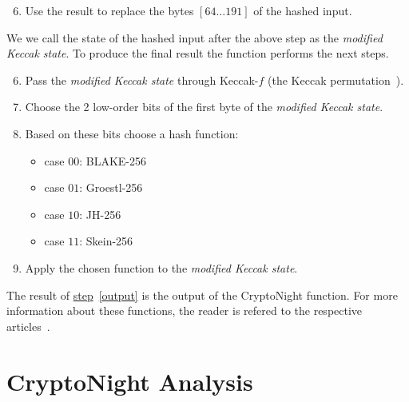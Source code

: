 \begin{enumerate}
  \setcounter{enumi}{5}
  \item \label{modified} Use the result to replace the bytes $[64...191]$ of the hashed input.
\end{enumerate}
We we call the state of the hashed input after the above step as the \emph{modified Keccak state}. To produce the final result the function performs the next steps.

\begin{enumerate}
  \setcounter{enumi}{5}
  \item Pass the \emph{modified Keccak state} through Keccak-$f$ (the Keccak permutation~\cite{keccak}).
  \item Choose the 2 low-order bits of the first byte of the \emph{modified Keccak state}.
  \item Based on these bits choose a hash function:
  \begin{itemize}
    \item case $00$: BLAKE-256
    \item case $01$: Groestl-256
    \item case $10$: JH-256
    \item case $11$: Skein-256
  \end{itemize}
  \item \label{output} Apply the chosen function to the \emph{modified Keccak state}.
\end{enumerate}
The result of \hyperref[output]{step}~\ref{output} is the output of the CryptoNight function. For more information about these functions, the reader is refered to the respective articles~\cite{10030667226,sha3groestl,sha3W09,sha3F+08}.

\section{CryptoNight Analysis}
